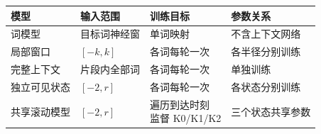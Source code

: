 \begingroup
\papertablestyle
\begin{tabular}{@{}llll@{}}
\toprule
模型 & 输入范围 & 训练目标 & 参数关系 \\
\midrule
词模型 & 目标词神经窗 & 单词映射 & 不含上下文网络 \\
局部窗口 & $[-k,k]$ & 各词每轮一次 & 各半径分别训练 \\
完整上下文 & 片段内全部词 & 各词每轮一次 & 单独训练 \\
独立可见状态 & $[-2,r]$ & 各词每轮一次 & 各状态分别训练 \\
共享滚动模型 & $[-2,r]$ & \shortstack[l]{遍历到达时刻\\监督 K0/K1/K2} & 三个状态共享参数 \\
\bottomrule
\end{tabular}
\endgroup
